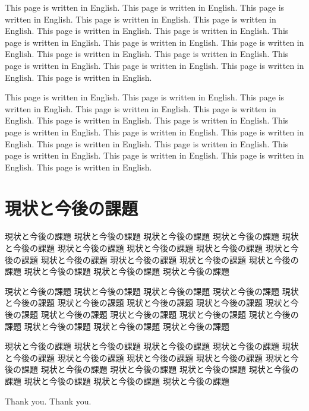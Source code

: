 \documentclass[12pt,dvipdfmx]{jarticle} %
\begin{document}
This page is written in English. This page is written in English. 
This page is written in English. This page is written in English. 
This page is written in English. This page is written in English. 
This page is written in English. This page is written in English. 
This page is written in English. This page is written in English. 
This page is written in English. This page is written in English. 
This page is written in English. This page is written in English. 
This page is written in English. This page is written in English. 

This page is written in English. This page is written in English. 
This page is written in English. This page is written in English. 
This page is written in English. This page is written in English. 
This page is written in English. This page is written in English. 
This page is written in English. This page is written in English. 
This page is written in English. This page is written in English. 
This page is written in English. This page is written in English. 
This page is written in English. This page is written in English. 


\newpage
\section{現状と今後の課題}
\label{kadai}

現状と今後の課題 現状と今後の課題 現状と今後の課題 現状と今後の課題 
現状と今後の課題 現状と今後の課題 現状と今後の課題 現状と今後の課題 
現状と今後の課題 現状と今後の課題 現状と今後の課題 現状と今後の課題 
現状と今後の課題 現状と今後の課題 現状と今後の課題 現状と今後の課題 

現状と今後の課題 現状と今後の課題 現状と今後の課題 現状と今後の課題 
現状と今後の課題 現状と今後の課題 現状と今後の課題 現状と今後の課題 
現状と今後の課題 現状と今後の課題 現状と今後の課題 現状と今後の課題 
現状と今後の課題 現状と今後の課題 現状と今後の課題 現状と今後の課題 

現状と今後の課題 現状と今後の課題 現状と今後の課題 現状と今後の課題 
現状と今後の課題 現状と今後の課題 現状と今後の課題 現状と今後の課題 
現状と今後の課題 現状と今後の課題 現状と今後の課題 現状と今後の課題 
現状と今後の課題 現状と今後の課題 現状と今後の課題 現状と今後の課題 

%
%
\acknowledgements

Thank you. Thank you.
%
%
\newpage


%
%
\appendix
\end{document}
